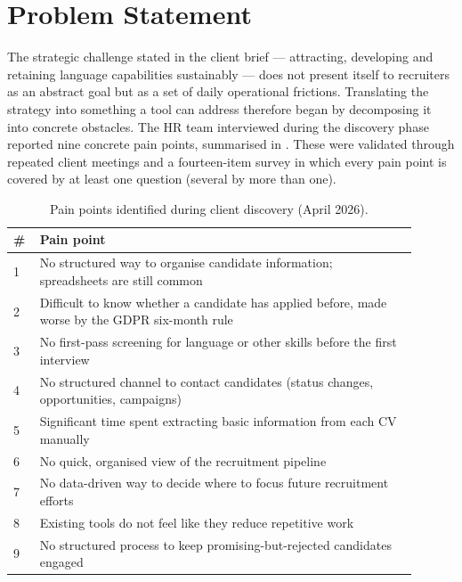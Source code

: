 
\section{Problem Statement}
\label{sec:problem}

The strategic challenge stated in the client brief --- attracting, developing
and retaining language capabilities sustainably --- does not present itself
to recruiters as an abstract goal but as a set of daily operational
frictions. Translating the strategy into something a tool can address
therefore began by decomposing it into concrete obstacles. The HR team
interviewed during the discovery phase reported nine concrete pain points,
summarised in
. These were validated through repeated
client meetings and a fourteen-item survey in which every pain point is
covered by at least one question (several by more than one).

\begin{table}[H]
\centering
\caption[Pain points identified during client discovery]{Pain points
identified during client discovery (April 2026).}
\label{tab:pain-points-overview}
\begin{tabular}{p{0.05\linewidth}p{0.85\linewidth}}
\toprule
\textbf{\#} & \textbf{Pain point} \\
\midrule
1 & No structured way to organise candidate information; spreadsheets are still common \\
2 & Difficult to know whether a candidate has applied before, made worse by the GDPR six-month rule \\
3 & No first-pass screening for language or other skills before the first interview \\
4 & No structured channel to contact candidates (status changes, opportunities, campaigns) \\
5 & Significant time spent extracting basic information from each CV manually \\
6 & No quick, organised view of the recruitment pipeline \\
7 & No data-driven way to decide where to focus future recruitment efforts \\
8 & Existing tools do not feel like they reduce repetitive work \\
9 & No structured process to keep promising-but-rejected candidates engaged \\
\bottomrule
\end{tabular}
\end{table}

